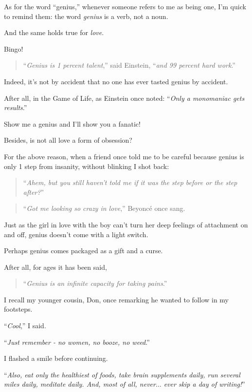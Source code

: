 \documentclass{article}
\begin{document}
%
As for the word ``genius,'' whenever someone refers to me as being one, I'm quick to remind them: the word \textit{genius} is a verb, not a noun.

And the same holds true for \textit{love}.

%
Bingo!

\begin{quotation}
	``\textit{Genius is 1 percent talent},'' said Einstein, ``\textit{and 99 percent hard work}.''
\end{quotation}
Indeed, it's not by accident that no one has ever tasted genius by accident.

After all, in the Game of Life, as Einstein once noted: ``\textit{Only a monomaniac gets results}.''

%
Show me a genius and I'll show you a fanatic!

Besides, is not all love a form of obsession?

%
For the above reason, when a friend once told me to be careful because genius is only 1 step from insanity, without blinking I shot back:

\begin{quotation}
	``\textit{Ahem, but you still haven't told me if it was the step before or the step after?}''
\end{quotation}

\begin{quotation}
	``\textit{Got me looking so crazy in love},'' Beyoncé once sang.
\end{quotation}
Just as the girl in love with the boy can't turn her deep feelings of attachment on and off, genius doesn't come with a light switch.

%
Perhaps genius comes packaged as a gift and a curse.

After all, for ages it has been said,
\begin{quotation}
	``\textit{Genius is an infinite capacity for taking pains}.''
\end{quotation}
I recall my younger cousin, Don, once remarking he wanted to follow in my footsteps.

%
``\textit{Cool},'' I said.

``\textit{Just remember - no women, no booze, no weed}.''

I flashed a smile before continuing.

``\textit{Also, eat only the healthiest of foods, take brain supplements daily, run several miles daily, meditate daily. And, most of all, never$\ldots$ ever skip a day of writing!}''
\end{document}
